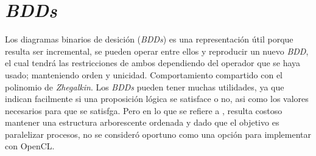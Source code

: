 \section{\textit{BDDs}}

Los diagramas binarios de desición (\textit{BDDs}) es una representación útil porque resulta ser incremental, se pueden operar entre ellos y reproducir un nuevo \textit{BDD}, el cual tendrá las restricciones de ambos dependiendo del operador que se haya usado; manteniendo orden y unicidad. Comportamiento compartido con el polinomio de \textit{Zhegalkin}. Los \textit{BDDs} pueden tener muchas utilidades, ya que indican facilmente si una proposición lógica se satisface o no, asi como los valores necesarios para que se satisfga. Pero en lo que se refiere a \sat, resulta costoso mantener una estructura arborescente ordenada y dado que el objetivo es paralelizar procesos, no se consideró oportuno como una opción para implementar con OpenCL.
